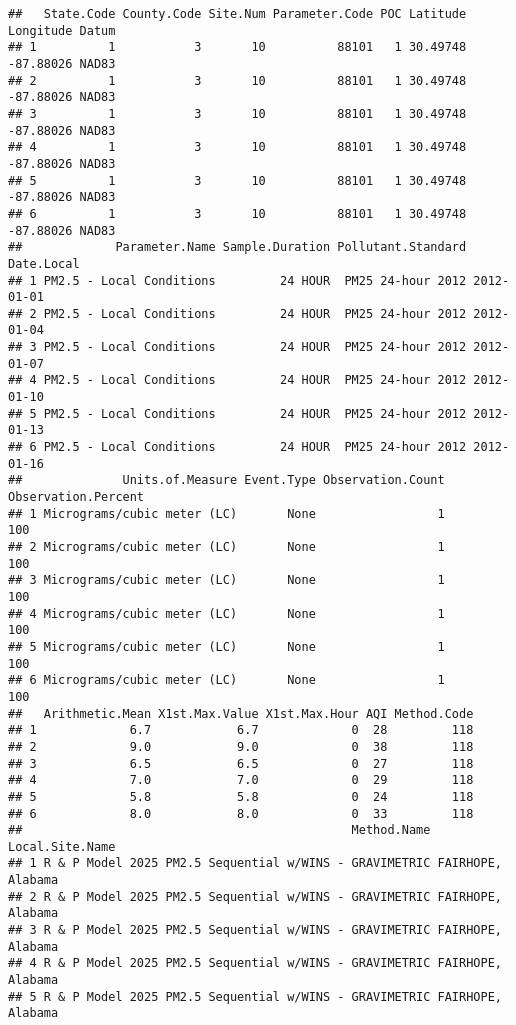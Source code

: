 \documentclass[
]{article}
\begin{document}
\begin{verbatim}
##   State.Code County.Code Site.Num Parameter.Code POC Latitude Longitude Datum
## 1          1           3       10          88101   1 30.49748 -87.88026 NAD83
## 2          1           3       10          88101   1 30.49748 -87.88026 NAD83
## 3          1           3       10          88101   1 30.49748 -87.88026 NAD83
## 4          1           3       10          88101   1 30.49748 -87.88026 NAD83
## 5          1           3       10          88101   1 30.49748 -87.88026 NAD83
## 6          1           3       10          88101   1 30.49748 -87.88026 NAD83
##             Parameter.Name Sample.Duration Pollutant.Standard Date.Local
## 1 PM2.5 - Local Conditions         24 HOUR  PM25 24-hour 2012 2012-01-01
## 2 PM2.5 - Local Conditions         24 HOUR  PM25 24-hour 2012 2012-01-04
## 3 PM2.5 - Local Conditions         24 HOUR  PM25 24-hour 2012 2012-01-07
## 4 PM2.5 - Local Conditions         24 HOUR  PM25 24-hour 2012 2012-01-10
## 5 PM2.5 - Local Conditions         24 HOUR  PM25 24-hour 2012 2012-01-13
## 6 PM2.5 - Local Conditions         24 HOUR  PM25 24-hour 2012 2012-01-16
##              Units.of.Measure Event.Type Observation.Count Observation.Percent
## 1 Micrograms/cubic meter (LC)       None                 1                 100
## 2 Micrograms/cubic meter (LC)       None                 1                 100
## 3 Micrograms/cubic meter (LC)       None                 1                 100
## 4 Micrograms/cubic meter (LC)       None                 1                 100
## 5 Micrograms/cubic meter (LC)       None                 1                 100
## 6 Micrograms/cubic meter (LC)       None                 1                 100
##   Arithmetic.Mean X1st.Max.Value X1st.Max.Hour AQI Method.Code
## 1             6.7            6.7             0  28         118
## 2             9.0            9.0             0  38         118
## 3             6.5            6.5             0  27         118
## 4             7.0            7.0             0  29         118
## 5             5.8            5.8             0  24         118
## 6             8.0            8.0             0  33         118
##                                              Method.Name   Local.Site.Name
## 1 R & P Model 2025 PM2.5 Sequential w/WINS - GRAVIMETRIC FAIRHOPE, Alabama
## 2 R & P Model 2025 PM2.5 Sequential w/WINS - GRAVIMETRIC FAIRHOPE, Alabama
## 3 R & P Model 2025 PM2.5 Sequential w/WINS - GRAVIMETRIC FAIRHOPE, Alabama
## 4 R & P Model 2025 PM2.5 Sequential w/WINS - GRAVIMETRIC FAIRHOPE, Alabama
## 5 R & P Model 2025 PM2.5 Sequential w/WINS - GRAVIMETRIC FAIRHOPE, Alabama

\end{verbatim}
\end{document}
